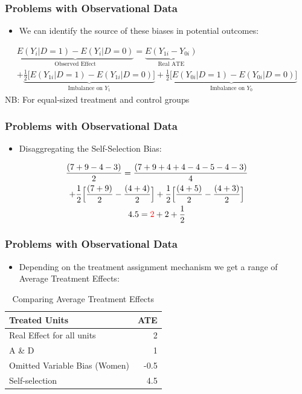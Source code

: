\documentclass[xcolor=x11names,compress]{beamer}\usepackage[]{graphicx}\usepackage[]{color}
\renewcommand{\(}{\begin{columns}}
\renewcommand{\)}{\end{columns}}
\newcommand{\<}[1]{\begin{column}{#1}}
\renewcommand{\>}{\end{column}}
\begin{document}
\begin{frame}
\frametitle{Problems with Observational Data}
\begin{itemize}
\item We can identify the source of these biases in potential outcomes:
\end{itemize}
\begin{multline}
\underbrace{E(Y_i|D=1)-E(Y_i|D=0)}_\text{Observed Effect} = \underbrace{E(Y_{1i} - Y_{0i})}_\text{Real ATE} \\ + \underbrace{\frac{1}{2}\Big[ E(Y_{1i}|D=1) - E(Y_{1i}|D=0) \Big]}_\text{Imbalance on $Y_1$} + \underbrace{\frac{1}{2}\Big[ E(Y_{0i}|D=1) - E(Y_{0i}|D=0) \Big]}_\text{Imbalance on $Y_0$}
\end{multline}
\footnotesize
NB: For equal-sized treatment and control groups
\normalsize
\end{frame}

\begin{frame}
\frametitle{Problems with Observational Data}
\begin{itemize}
\item Disaggregating the Self-Selection Bias:
\end{itemize}
\begin{center}
\begin{multline}
\frac{(7+9-4-3)}{2} = \frac{(7+9+4+4-4-5-4-3)}{4} \\+ \frac{1}{2}\Big[ \frac{(7+9)}{2} - \frac{(4+4)}{2} \Big] + \frac{1}{2} \Big[ \frac{(4+5)}{2}- \frac{(4+3)}{2}\Big] \\
4.5 = \color{red}2 \color{black}+ 2 + \frac{1}{2}
\end{multline}
\end{center}
\end{frame}

\begin{frame}
\frametitle{Problems with Observational Data}
\begin{itemize}
\item Depending on the treatment assignment mechanism we get a range of Average Treatment Effects:
\end{itemize}
\begin{table}[htbp]
  \centering
  \caption{Comparing Average Treatment Effects}
    \begin{tabular}{|l|r|}
    \hline
    \textbf{Treated Units} & \multicolumn{1}{l|}{\textbf{ATE}} \bigstrut\\
    \hline
    Real Effect for all units & 2 \bigstrut\\
    \hline
    A \& D & 1 \bigstrut\\
    \hline
    Omitted Variable Bias (Women) & -0.5 \bigstrut\\
    \hline
    Self-selection & 4.5 \bigstrut\\
    \hline
    \end{tabular}%
\end{table}%
\end{frame}
\end{document}
